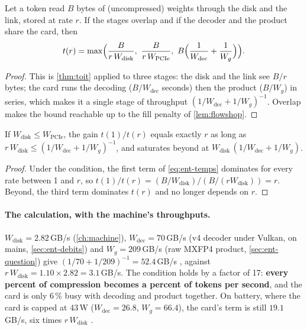 \begin{proposition}\label{prop:ent-temps}
Let a token read $B$ bytes of (uncompressed) weights through the disk and the link, stored at rate $r$. If the stages overlap and if the decoder and the product share the card, then
\begin{equation}\label{eq:ent-temps}
t(r) = \max\Bigl( \frac{B}{r\,W_{\mathrm{disk}}},\ \frac{B}{r\,W_{\mathrm{PCIe}}},\ B\Bigl(\frac{1}{W_{\mathrm{dec}}} + \frac{1}{W_g}\Bigr) \Bigr).
\end{equation}
\end{proposition}

\begin{proof}
This is \cref{thm:toit} applied to three stages: the disk and the link see $B/r$ bytes; the card runs the decoding ($B/W_{\mathrm{dec}}$ seconds) then the product ($B/W_g$) in series, which makes it a single stage of throughput $(1/W_{\mathrm{dec}} + 1/W_g)^{-1}$. Overlap makes the bound reachable up to the fill penalty of \cref{lem:flowshop}.
\end{proof}

\begin{corollaire}\label{cor:ent-gain}
If $W_{\mathrm{disk}} \le W_{\mathrm{PCIe}}$, the gain $t(1)/t(r)$ equals exactly $r$ as long as $r\,W_{\mathrm{disk}} \le (1/W_{\mathrm{dec}} + 1/W_g)^{-1}$, and saturates beyond at $W_{\mathrm{disk}}\,(1/W_{\mathrm{dec}} + 1/W_g)$.
\end{corollaire}

\begin{proof}
Under the condition, the first term of \eqref{eq:ent-temps} dominates for every rate between 1 and $r$, so $t(1)/t(r) = (B/W_{\mathrm{disk}})/(B/(rW_{\mathrm{disk}})) = r$. Beyond, the third term dominates $t(r)$ and no longer depends on $r$.
\end{proof}

\paragraph{The calculation, with the machine's throughputs.} $W_{\mathrm{disk}} = 2.82$\,GB/s (\cref{ch:machine}), $W_{\mathrm{dec}} = 70$\,GB/s (v4 decoder under Vulkan, on mains, \cref{sec:ent-debits}) and $W_g = 209$\,GB/s (raw MXFP4 product, \cref{sec:ent-question}) give $(1/70 + 1/209)^{-1} = 52.4$\,GB/s \calc, against $r\,W_{\mathrm{disk}} = 1.10 \times 2.82 = 3.1$\,GB/s. The condition holds by a factor of 17: \textbf{every percent of compression becomes a percent of tokens per second}, and the card is only 6\,\% busy with decoding and product together. On battery, where the card is capped at 43\,W ($W_{\mathrm{dec}} = 26.8$, $W_g = 66.4$), the card's term is still $19.1$\,GB/s, six times $r\,W_{\mathrm{disk}}$ \calc.

